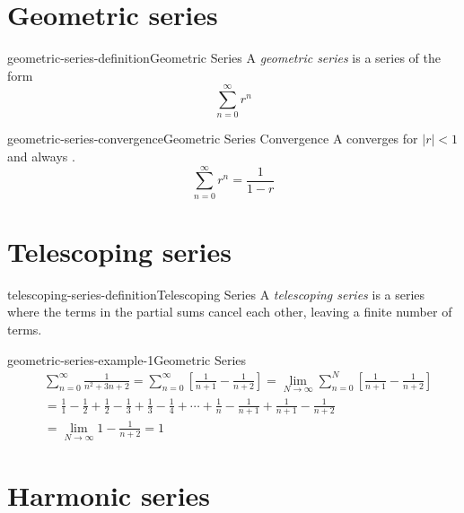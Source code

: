 \documentclass[preview]{standalone}
\begin{document}
\genpage


\section{Geometric series}

\begin{snippetdefinition}{geometric-series-definition}{Geometric Series}
    A \textit{geometric series} is a series of the form
    \[
        \sum_{n=0}^\infty r^n
    \]
\end{snippetdefinition}


\begin{snippettheorem}{geometric-series-convergence}{Geometric Series Convergence}
    A \geometricseries converges for \(|r| < 1\) and always \convergesabsolutely.
    \[
        \sum_{n=0}^\infty r^n = \frac{1}{1-r}
    \]
\end{snippettheorem}

\section{Telescoping series}

\begin{snippetdefinition}{telescoping-series-definition}{Telescoping Series}
    A \textit{telescoping series} is a series where the terms in the partial sums cancel each other,
    leaving a finite number of terms.
\end{snippetdefinition}

\begin{snippetexample}{geometric-series-example-1}{Geometric Series}
    \begin{align*}
        &\sum_{n=0}^\infty \frac{1}{n^2 + 3n + 2}
        = \sum_{n=0}^\infty \left[ \frac{1}{n+1} - \frac{1}{n+2} \right]
        = \lim_{N \to \infty} \sum_{n=0}^N \left[ \frac{1}{n+1} - \frac{1}{n+2} \right] \\
        &= \frac{1}{1} - \frac{1}{2} + \frac{1}{2} - \frac{1}{3}
        + \frac{1}{3} - \frac{1}{4} + \cdots + \frac{1}{n} - \frac{1}{n+1} +
        \frac{1}{n+1} - \frac{1}{n+2} \\
        &= \lim_{N \to \infty} 1 - \frac{1}{n+2} = 1
    \end{align*}
\end{snippetexample}

\section{Harmonic series}
\end{document}
